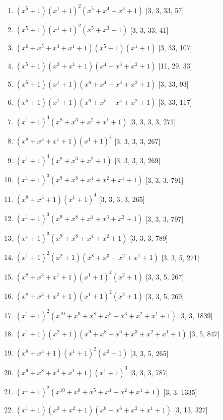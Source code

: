 \documentclass[10pt,twocolumn]{article}
\begin{document}
\begin{enumerate}
\item $(x^{5} + 1)(x^{1} + 1)^{2}(x^{5} + x^{4} + x^{3} + 1)$  [3, 3, 33, 57]
\item $(x^{5} + 1)(x^{1} + 1)^{2}(x^{5} + x^{3} + 1)$  [3, 3, 33, 41]
\item $(x^{6} + x^{5} + x^{3} + x^{1} + 1)(x^{5} + 1)(x^{1} + 1)$  [3, 33, 107]
\item $(x^{5} + 1)(x^{3} + x^{1} + 1)(x^{4} + x^{3} + x^{2} + 1)$  [11, 29, 33]
\item $(x^{5} + 1)(x^{1} + 1)(x^{6} + x^{4} + x^{3} + x^{2} + 1)$  [3, 33, 93]
\item $(x^{5} + 1)(x^{1} + 1)(x^{6} + x^{5} + x^{4} + x^{2} + 1)$  [3, 33, 117]
\item $(x^{1} + 1)^{4}(x^{8} + x^{3} + x^{2} + x^{1} + 1)$  [3, 3, 3, 3, 271]
\item $(x^{8} + x^{3} + x^{1} + 1)(x^{1} + 1)^{4}$  [3, 3, 3, 3, 267]
\item $(x^{1} + 1)^{4}(x^{8} + x^{3} + x^{2} + 1)$  [3, 3, 3, 3, 269]
\item $(x^{1} + 1)^{3}(x^{9} + x^{8} + x^{4} + x^{2} + x^{1} + 1)$  [3, 3, 3, 791]
\item $(x^{8} + x^{3} + 1)(x^{1} + 1)^{4}$  [3, 3, 3, 3, 265]
\item $(x^{1} + 1)^{3}(x^{9} + x^{8} + x^{4} + x^{3} + x^{2} + 1)$  [3, 3, 3, 797]
\item $(x^{1} + 1)^{3}(x^{9} + x^{8} + x^{4} + x^{2} + 1)$  [3, 3, 3, 789]
\item $(x^{1} + 1)^{2}(x^{2} + 1)(x^{8} + x^{3} + x^{2} + x^{1} + 1)$  [3, 3, 5, 271]
\item $(x^{8} + x^{3} + x^{1} + 1)(x^{1} + 1)^{2}(x^{2} + 1)$  [3, 3, 5, 267]
\item $(x^{8} + x^{3} + x^{2} + 1)(x^{1} + 1)^{2}(x^{2} + 1)$  [3, 3, 5, 269]
\item $(x^{1} + 1)^{2}(x^{10} + x^{9} + x^{8} + x^{5} + x^{3} + x^{2} + x^{1} + 1)$  [3, 3, 1839]
\item $(x^{1} + 1)(x^{2} + 1)(x^{9} + x^{8} + x^{6} + x^{3} + x^{2} + x^{1} + 1)$  [3, 5, 847]
\item $(x^{8} + x^{3} + 1)(x^{1} + 1)^{2}(x^{2} + 1)$  [3, 3, 5, 265]
\item $(x^{9} + x^{8} + x^{4} + x^{1} + 1)(x^{1} + 1)^{3}$  [3, 3, 3, 787]
\item $(x^{1} + 1)^{2}(x^{10} + x^{8} + x^{5} + x^{4} + x^{2} + x^{1} + 1)$  [3, 3, 1335]
\item $(x^{1} + 1)(x^{3} + x^{2} + 1)(x^{8} + x^{6} + x^{2} + x^{1} + 1)$  [3, 13, 327]

\end{enumerate}
\end{document}
